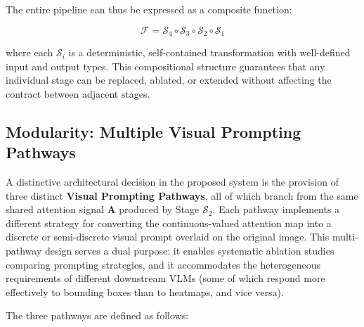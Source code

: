 The entire pipeline can thus be expressed as a composite function:

\[
\mathcal{F} = \mathcal{S}_4 \circ \mathcal{S}_3 \circ \mathcal{S}_2 \circ \mathcal{S}_1
\]

where each $\mathcal{S}_i$ is a deterministic, self-contained transformation with well-defined input and output types. This compositional structure guarantees that any individual stage can be replaced, ablated, or extended without affecting the contract between adjacent stages. %

\subsection{Modularity: Multiple Visual Prompting Pathways}
\label{sec:3_1_3}
A distinctive architectural decision in the proposed system is the provision of three distinct \textbf{Visual Prompting Pathways}, all of which branch from the same shared attention signal $\mathbf{A}$ produced by Stage $\mathcal{S}_2$. Each pathway implements a different strategy for converting the continuous-valued attention map into a discrete or semi-discrete visual prompt overlaid on the original image. This multi-pathway design serves a dual purpose: it enables systematic ablation studies comparing prompting strategies, and it accommodates the heterogeneous requirements of different downstream VLMs (some of which respond more effectively to bounding boxes than to heatmaps, and vice versa).

The three pathways are defined as follows:


